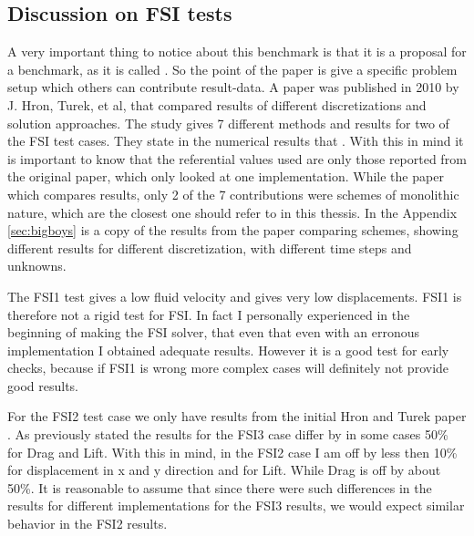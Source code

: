 \subsection*{Discussion on FSI tests}
 A very important thing to notice about this benchmark \cite{Hron2006a} is that it is a proposal for a benchmark, as it is called . So the point of the paper is give a specific problem setup which others can contribute result-data. A paper was published in 2010 by J. Hron, Turek, et al, \cite{Turek2010} that compared results of different discretizations and solution approaches. The study \cite{Turek2010} gives 7 different methods and results for two of the FSI test cases. They state in the numerical results that . With this in mind it is important to know that the referential values used are only those reported from the original paper, which only looked at one implementation. While the paper which compares results, only 2 of the 7 contributions were schemes of monolithic nature, which are the closest one should refer to in this thessis.  In the Appendix \ref{sec:bigboys} is a copy of the results from the paper comparing schemes, showing different results for different discretization, with different time steps and unknowns. 

The FSI1 test gives a low fluid velocity and gives very low displacements. FSI1 is therefore not a rigid test for FSI. In fact I personally experienced in the beginning of making the FSI solver, that even that even with an erronous implementation I obtained adequate results. However it is a good test for early checks, because if FSI1 is wrong more complex cases will definitely not provide good results.  \newline

For the FSI2 test case we only have results from the initial Hron and Turek paper \cite{Hron2006a}. As previously stated the results for the FSI3 case differ by in some cases 50\% for Drag and Lift. With this in mind, in the FSI2 case I am off by less then 10\% for displacement in x and y direction and for Lift. While Drag is off by about  50\%. It is reasonable to assume that since there were such differences in the results for different implementations for the FSI3 results, we would expect similar behavior in the FSI2 results.

